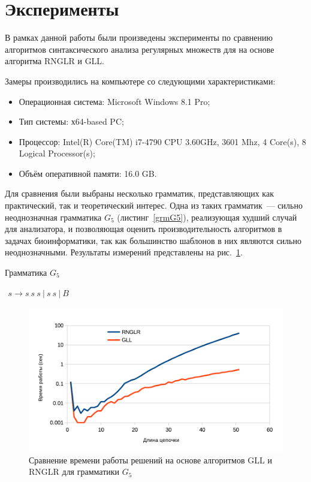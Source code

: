 \section{Эксперименты}
В рамках данной работы были произведены эксперименты по сравнению алгоритмов синтаксического анализа регулярных множеств для на основе алгоритма RNGLR и GLL. 

Замеры производились на компьютере со следующими характеристиками:

\begin{itemize}
\item Операционная система: Microsoft Windows 8.1 Pro;
\item Тип системы: х64-based PC;
\item Процессор: Intel(R) Core(TM) i7-4790 CPU 3.60GHz, 3601 Mhz, 4 Core(s), 8 Logical Processor(s);
\item Объём оперативной памяти: 16.0 GB.
\end{itemize}

Для сравнения были выбраны несколько грамматик, представляющих как практический, так и теоретический интерес. Одна из таких грамматик~--- сильно неоднозначная грамматика $G_5$ (листинг~\ref{grmG5}), реализующая худший случай для анализатора, и позволяющая оценить производительность алгоритмов в задачах биоинформатики, так как большинство шаблонов в них являются сильно неоднозначными. Результаты измерений представлены на рис.~\ref{exp1}. 

\begin{listing}
\caption{Грамматика $G_5$}
\label{grmG5}
\centering
$\begin{array}{rl}
s \rightarrow s \ s \ s \ |  \ s \ s \ | \ B 
\end{array}$
\end{listing} 

\begin{figure}
 \centering
 \includegraphics[width=\textwidth]{Ragozina/pics/UmbLog.pdf}
 \caption{Сравнение времени работы решений на основе алгоритмов GLL и RNGLR для грамматики $G_5$}
 \label{exp1}
\end{figure}

